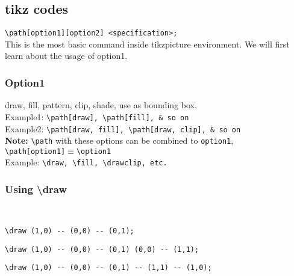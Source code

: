 \documentclass{article}
\begin{document}
\subsection{tikz codes}
\verb|\path[option1][option2] <specification>;|\\
This is the most basic command inside tikzpicture environment. We will first learn about the usage of option1.

\subsubsection{Option1}
draw, fill, pattern, clip, shade, use as bounding box.\\
\quad Example1: \verb|\path[draw], \path[fill], & so on|\\
\quad Example2: \verb|\path[draw, fill], \path[draw, clip], & so on|\\

\textbf{Note:} \verb|\path| with these options can be combined to \verb|option1|,\\

\qquad \verb|\path[option1]|$\equiv$\verb|\option1|\\

Example: \verb|\draw, \fill, \drawclip, etc.|

\subsubsection*{Using \textbackslash draw}

\quad~

\verb|\draw (1,0) -- (0,0) -- (0,1);|

\vskip25pt

\verb|\draw (1,0) -- (0,0) -- (0,1) (0,0) -- (1,1);|

\vskip25pt

\verb|\draw (1,0) -- (0,0) -- (0,1) -- (1,1) -- (1,0);|

\vskip25pt
\end{document}
